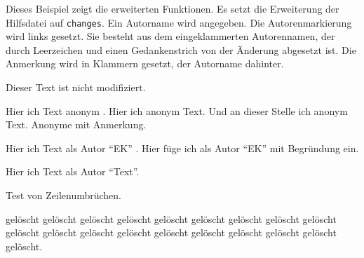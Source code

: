 \documentclass[ngerman]{article}
\begin{document}
	Dieses Beispiel zeigt die erweiterten Funktionen.
	Es setzt die Erweiterung der Hilfsdatei auf \texttt{changes}.
	Ein Autorname wird angegeben.
	Die Autorenmarkierung wird links gesetzt.
	Sie besteht aus dem eingeklammerten Autorennamen, der durch Leerzeichen und einen Gedankenstrich von der Änderung abgesetzt ist.
	Die Anmerkung wird in Klammern gesetzt, der Autorname dahinter.

	\listofchanges

	Dieser Text ist nicht modifiziert.

	Hier  ich Text anonym .
	Hier  ich anonym Text.
	Und an dieser Stelle  ich anonym Text.
	Anonyme  mit Anmerkung.

	Hier  ich Text als Autor "`EK"' .
	Hier füge ich  als Autor "`EK"' mit Begründung ein.

	Hier  ich Text als Autor "`Text"'.

	Test von Zeilenumbrüchen.



		{gelöscht gelöscht gelöscht gelöscht gelöscht gelöscht gelöscht gelöscht gelöscht gelöscht gelöscht gelöscht gelöscht gelöscht gelöscht gelöscht gelöscht gelöscht gelöscht.}
\end{document}
